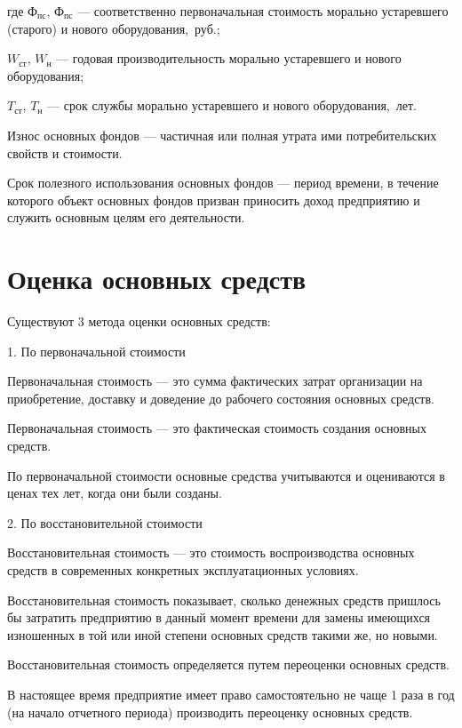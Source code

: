 где $\text{Ф}_{\text{пс}}$, $\text{Ф}_{\text{пс}}$ --- соответственно
первоначальная стоимость морально устаревшего (старого) и нового
оборудования,~руб.;

$W_{\text{ст}}$, $W_{\text{н}}$ --- годовая производительность морально
устаревшего и нового оборудования;

$T_{\text{ст}}$, $T_{\text{н}}$ --- срок службы морально устаревшего и нового
оборудования,~лет.

Износ основных фондов --- частичная или полная утрата ими потребительских
свойств и стоимости.

Срок полезного использования основных фондов --- период времени, в течение
которого объект основных фондов призван приносить доход предприятию и служить
основным целям его деятельности.


\section{Оценка основных средств}

Существуют 3 метода оценки основных средств:

1. По первоначальной стоимости

Первоначальная стоимость --- это сумма фактических затрат организации на
приобретение, доставку и доведение до рабочего состояния основных средств.

Первоначальная стоимость --- это фактическая стоимость создания основных средств.

По первоначальной стоимости основные средства учитываются и оцениваются в ценах
тех лет, когда они были созданы.

2. По восстановительной стоимости

Восстановительная стоимость --- это стоимость воспроизводства основных средств в
современных конкретных эксплуатационных условиях.

Восстановительная стоимость показывает, сколько денежных средств пришлось бы
затратить предприятию в данный момент времени для замены имеющихся изношенных в
той или иной степени основных средств такими же, но новыми.

Восстановительная стоимость определяется путем переоценки основных средств.

В настоящее время предприятие имеет право самостоятельно не чаще 1 раза в год
(на начало отчетного периода) производить переоценку основных средств.

